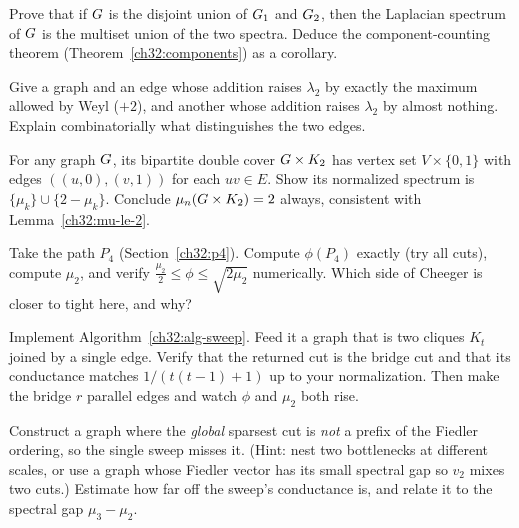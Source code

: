 \begin{exercise}
Prove that if $G$ is the disjoint union of $G_1$ and $G_2$, then the Laplacian spectrum of $G$ is the multiset union of the two spectra. Deduce the component-counting theorem (Theorem~\ref{ch32:components}) as a corollary.
\end{exercise}

\begin{exercise}
Give a graph and an edge whose addition raises $\lambda_2$ by exactly the maximum allowed by Weyl ($+2$), and another whose addition raises $\lambda_2$ by almost nothing. Explain combinatorially what distinguishes the two edges.
\end{exercise}

\begin{exercise}
For any graph $G$, its bipartite double cover $G\times K_2$ has vertex set $V\times\{0,1\}$ with edges $((u,0),(v,1))$ for each $uv\in E$. Show its normalized spectrum is $\{\mu_k\}\cup\{2-\mu_k\}$. Conclude $\mu_n(G\times K_2)=2$ always, consistent with Lemma~\ref{ch32:mu-le-2}.
\end{exercise}

\begin{exercise}
Take the path $P_4$ (Section~\ref{ch32:p4}). Compute $\phi(P_4)$ exactly (try all cuts), compute $\mu_2$, and verify $\tfrac{\mu_2}{2}\le\phi\le\sqrt{2\mu_2}$ numerically. Which side of Cheeger is closer to tight here, and why?
\end{exercise}

\begin{exercise}
Implement Algorithm~\ref{ch32:alg-sweep}. Feed it a graph that is two cliques $K_t$ joined by a single edge. Verify that the returned cut is the bridge cut and that its conductance matches $1/(t(t-1)+1)$ up to your normalization. Then make the bridge $r$ parallel edges and watch $\phi$ and $\mu_2$ both rise.
\end{exercise}

\begin{exercise}
Construct a graph where the \emph{global} sparsest cut is \emph{not} a prefix of the Fiedler ordering, so the single sweep misses it. (Hint: nest two bottlenecks at different scales, or use a graph whose Fiedler vector has its small spectral gap so $v_2$ mixes two cuts.) Estimate how far off the sweep's conductance is, and relate it to the spectral gap $\mu_3-\mu_2$.
\end{exercise}

